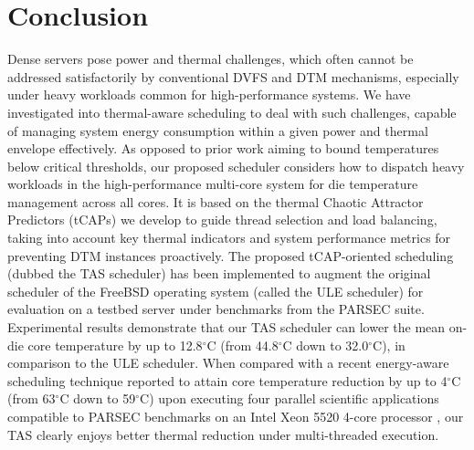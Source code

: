 \documentclass[times, 10pt,twocolumn]{IEEEtran}
\begin{document}
\section{Conclusion}
\label{sec:conclusion}
Dense servers pose power and thermal challenges, which often cannot be
addressed satisfactorily by conventional DVFS and DTM mechanisms,
especially under heavy workloads common for high-performance systems.
We have investigated into thermal-aware scheduling to deal with such
challenges, capable of managing system energy consumption within a given
power and thermal envelope effectively.  As opposed to prior work aiming
to bound temperatures below critical thresholds, our proposed scheduler
considers how to dispatch heavy workloads in the high-performance
multi-core system for die temperature management across all cores.  It
is based on the thermal Chaotic Attractor Predictors (tCAPs) we develop
to guide thread selection and load balancing, taking into account key
thermal indicators and system performance metrics for preventing DTM
instances proactively.  The proposed tCAP-oriented scheduling (dubbed
the TAS scheduler) has been implemented to augment the original
scheduler of the FreeBSD operating system (called the ULE scheduler) for
evaluation on a testbed server under benchmarks from the PARSEC suite.
Experimental results demonstrate that our TAS scheduler can lower the
mean on-die core temperature by up to 12.8$^{\circ}$C (from 44.8$^\circ$C
down to 32.0$^\circ$C), in comparison to the ULE
scheduler.  When compared with a recent energy-aware scheduling
technique reported to attain core temperature reduction by up to
4$^\circ$C (from 63$^\circ$C down to 59$^\circ$C) upon executing four
parallel scientific applications compatible to PARSEC benchmarks on an
Intel Xeon 5520 4-core processor \cite{Sarood2011}, our TAS clearly
enjoys better thermal reduction under multi-threaded execution.

\label{sec:references}
\begin{small}


\end{small}
\end{document}
